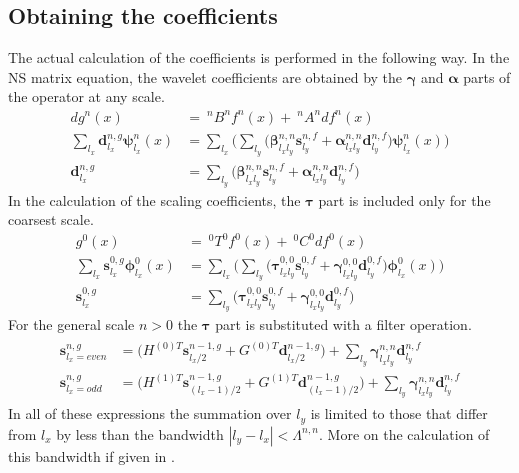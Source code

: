 \subsection*{Obtaining the coefficients}
The actual calculation of the coefficients is performed in the following way.
In the NS matrix equation, the wavelet coefficients are obtained by the 
$\boldsymbol{\gamma}$ and $\boldsymbol{\alpha}$ parts of the operator at any 
scale.
\begin{align}
	\nonumber
	dg^n(x) &=\ ^nB^nf^n(x) +\ ^nA^n df^n(x)\\
	\nonumber
	\sum_{l_x} \boldsymbol{d}^{n,g}_{l_x}\boldsymbol{\psi}^n_{l_x}(x)
	&= \sum_{l_x}\Bigg(\sum_{l_y}
	\bigg(\boldsymbol{\beta}_{l_xl_y}^{n,n}\boldsymbol{s}^{n,f}_{l_y} +
	\boldsymbol{\alpha}^{n,n}_{l_xl_y}\boldsymbol{d}^{n,f}_{l_y}\bigg)
	\boldsymbol{\psi}_{l_x}^n(x)\Bigg)\\
	\boldsymbol{d}^{n,g}_{l_x} &= 
	\sum_{l_y}\bigg(\boldsymbol{\beta}_{l_xl_y}^{n,n}\boldsymbol{s}^{n,f}_{l_y}
	+ \boldsymbol{\alpha}^{n,n}_{l_xl_y}\boldsymbol{d}^{n,f}_{l_y}\bigg)
\end{align}
In the calculation of the scaling coefficients, the $\boldsymbol{\tau}$ part is
included only for the coarsest scale.
\begin{align}
	\nonumber
	g^0(x) &=\ ^0T^0f^0(x) +\ ^0C^0 df^0(x)\\
	\nonumber
	\sum_{l_x} \boldsymbol{s}^{0,g}_{l_x}\boldsymbol{\phi}^0_{l_x}(x)
	&= \sum_{l_x}\Bigg(\sum_{l_y}
	\bigg(\boldsymbol{\tau}_{l_xl_y}^{0,0}\boldsymbol{s}^{0,f}_{l_y} +
	\boldsymbol{\gamma}^{0,0}_{l_xl_y}\boldsymbol{d}^{0,f}_{l_y}\bigg)
	\boldsymbol{\phi}_{l_x}^0(x)\Bigg)\\
	\boldsymbol{s}^{0,g}_{l_x} &= 
	\sum_{l_y}\bigg(\boldsymbol{\tau}_{l_xl_y}^{0,0}\boldsymbol{s}^{0,f}_{l_y}
	+ \boldsymbol{\gamma}^{0,0}_{l_xl_y}\boldsymbol{d}^{0,f}_{l_y}\bigg)
\end{align}
For the general scale $n>0$ the $\boldsymbol{\tau}$ part is substituted with a
filter operation.
\begin{align}
	\begin{split}
	\boldsymbol{s}^{n,g}_{l_x=even} &= \bigg(H^{(0)T}
	\boldsymbol{s}^{n-1,g}_{l_x/2} +
	G^{(0)T}\boldsymbol{d}^{n-1,g}_{l_x/2}\bigg) + \sum_{l_y}
	\boldsymbol{\gamma}^{n,n}_{l_xl_y}\boldsymbol{d}^{n,f}_{l_y}\\
	\boldsymbol{s}^{n,g}_{l_x=odd} &= \bigg(H^{(1)T}
	\boldsymbol{s}^{n-1,g}_{(l_x-1)/2} +
	G^{(1)T}\boldsymbol{d}^{n-1,g}_{(l_x-1)/2}\bigg) + \sum_{l_y}
	\boldsymbol{\gamma}^{n,n}_{l_xl_y}\boldsymbol{d}^{n,f}_{l_y}
	\end{split}
\end{align}
In all of these expressions the summation over $l_y$ is limited to those that
differ from $l_x$ by less than the bandwidth $|l_y-l_x| < \Lambda^{n,n}$. More
on the calculation of this bandwidth if given in \cite{Fossgaard}.

